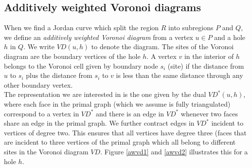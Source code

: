 \subsection{Additively weighted Voronoi diagrams}
When we find a Jordan curve which split the region $R$ into subregions $P$ and $Q$, we
define an \textit{additively weighted Voronoi diagram} from a vertex $u\in P$ and a hole
$h$ in $Q$. We write $VD(u,h)$ to denote the diagram. The sites of the Voronoi diagram
are the boundary vertices of the hole $h$. A vertex $v$ in the interior of $h$ belongs to
the Voronoi cell given by boundary node $s_i$ (site) if the distance from $u$ to $s_i$ plus the distance from $s_i$ to $v$ is less
than the same distance through any other boundary vertex. \\
The representation we are interested in is the one given by the dual $VD^*(u,h)$, where
each face in the primal graph (which we assume is fully triangulated) correspond to a
vertex in $VD^*$ and there is an edge in $VD^*$ whenever two faces share an edge in the
primal graph. We further contract edges in $VD^*$ incident to vertices of degree two.
This ensures that all vertices have degree three (faces that are incident to three
vertices of the primal graph which all belong to different sites in the Voronoi diagram
$VD$. Figure \ref{awvd1} and \ref{awvd2} illustrates this for a hole $h$. \\

